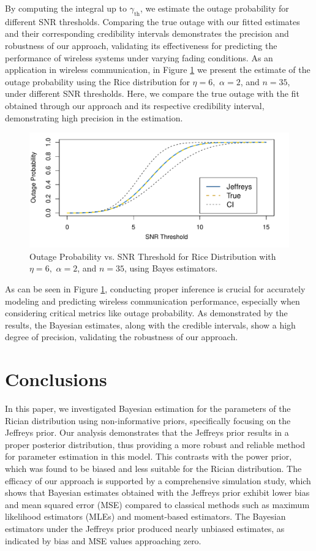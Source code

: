 \documentclass[12pt]{interact}
\theoremstyle{plain}%
\theoremstyle{definition}
\theoremstyle{remark}
\begin{document}
By computing the integral up to \( \gamma_{\text{th}} \), we estimate the outage probability for different SNR thresholds. Comparing the true outage with our fitted estimates and their corresponding credibility intervals demonstrates the precision and robustness of our approach, validating its effectiveness for predicting the performance of wireless systems under varying fading conditions.
As an application in wireless communication, in Figure \ref{graf3} we present the estimate of the outage probability using the Rice distribution for $\eta = 6,$ $\alpha = 2$, and $n = 35$, under different SNR thresholds. Here, we compare the true outage with the fit obtained through our approach and its respective credibility interval, demonstrating high precision in the estimation.
\begin{figure}[!h]
\centering
\includegraphics[scale=0.5]{outrage.pdf}
\caption{Outage Probability vs. SNR Threshold for Rice Distribution with $\eta = 6,$ $\alpha = 2$, and $n = 35$, using Bayes estimators.}
\label{graf3}
\end{figure}

As can be seen in  Figure \ref{graf3}, conducting proper inference is crucial for accurately modeling and predicting wireless communication performance, especially when considering critical metrics like outage probability. As demonstrated by the results, the Bayesian estimates, along with the credible intervals, show a high degree of precision, validating the robustness of our approach.

\section{Conclusions}

In this paper, we investigated Bayesian estimation for the parameters of the Rician distribution using non-informative priors, specifically focusing on the Jeffreys prior. Our analysis demonstrates that the Jeffreys prior results in a proper posterior distribution, thus providing a more robust and reliable method for parameter estimation in this model. This contrasts with the power prior, which was found to be biased and less suitable for the Rician distribution. The efficacy of our approach is supported by a comprehensive simulation study, which shows that Bayesian estimates obtained with the Jeffreys prior exhibit lower bias and mean squared error (MSE) compared to classical methods such as maximum likelihood estimators (MLEs) and moment-based estimators. The Bayesian estimators under the Jeffreys prior produced nearly unbiased estimates, as indicated by bias and MSE values approaching zero.
\end{document}
